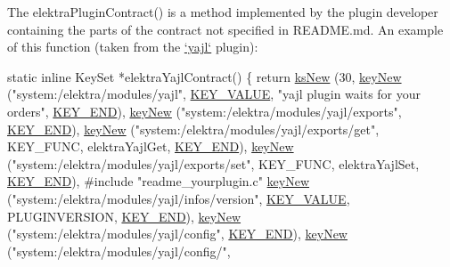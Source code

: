 The {\ttfamily elektra\+Plugin\+Contract()} is a method implemented by the plugin developer containing the parts of the contract not specified in {\ttfamily R\+E\+A\+D\+M\+E.\+md}. An example of this function (taken from the \hyperlink{autotoc_md786_src_plugins_yajl_README_md}{`yajl`} plugin)\+:


\begin{DoxyCode}
\textcolor{keyword}{static} \textcolor{keyword}{inline} KeySet *elektraYajlContract()
\{
        \textcolor{keywordflow}{return} \hyperlink{group__keyset_ga671e1aaee3ae9dc13b4834a4ddbd2c3c}{ksNew} (30,
        \hyperlink{group__key_gad23c65b44bf48d773759e1f9a4d43b89}{keyNew} (\textcolor{stringliteral}{"system:/elektra/modules/yajl"},
                \hyperlink{group__key_gga9b703ca49f48b482def322b77d3e6bc8ac66e4a49d09212b79f5754ca6db5bd2e}{KEY\_VALUE}, \textcolor{stringliteral}{"yajl plugin waits for your orders"}, \hyperlink{group__key_gga9b703ca49f48b482def322b77d3e6bc8aa8adb6fcb92dec58fb19410eacfdd403}{KEY\_END}),
        \hyperlink{group__key_gad23c65b44bf48d773759e1f9a4d43b89}{keyNew} (\textcolor{stringliteral}{"system:/elektra/modules/yajl/exports"}, \hyperlink{group__key_gga9b703ca49f48b482def322b77d3e6bc8aa8adb6fcb92dec58fb19410eacfdd403}{KEY\_END}),
        \hyperlink{group__key_gad23c65b44bf48d773759e1f9a4d43b89}{keyNew} (\textcolor{stringliteral}{"system:/elektra/modules/yajl/exports/get"},
                KEY\_FUNC, elektraYajlGet,
                \hyperlink{group__key_gga9b703ca49f48b482def322b77d3e6bc8aa8adb6fcb92dec58fb19410eacfdd403}{KEY\_END}),
        \hyperlink{group__key_gad23c65b44bf48d773759e1f9a4d43b89}{keyNew} (\textcolor{stringliteral}{"system:/elektra/modules/yajl/exports/set"},
                KEY\_FUNC, elektraYajlSet,
                \hyperlink{group__key_gga9b703ca49f48b482def322b77d3e6bc8aa8adb6fcb92dec58fb19410eacfdd403}{KEY\_END}),
#include \textcolor{stringliteral}{"readme\_yourplugin.c"}
        \hyperlink{group__key_gad23c65b44bf48d773759e1f9a4d43b89}{keyNew} (\textcolor{stringliteral}{"system:/elektra/modules/yajl/infos/version"},
                \hyperlink{group__key_gga9b703ca49f48b482def322b77d3e6bc8ac66e4a49d09212b79f5754ca6db5bd2e}{KEY\_VALUE}, PLUGINVERSION, \hyperlink{group__key_gga9b703ca49f48b482def322b77d3e6bc8aa8adb6fcb92dec58fb19410eacfdd403}{KEY\_END}),
        \hyperlink{group__key_gad23c65b44bf48d773759e1f9a4d43b89}{keyNew} (\textcolor{stringliteral}{"system:/elektra/modules/yajl/config"}, \hyperlink{group__key_gga9b703ca49f48b482def322b77d3e6bc8aa8adb6fcb92dec58fb19410eacfdd403}{KEY\_END}),
        \hyperlink{group__key_gad23c65b44bf48d773759e1f9a4d43b89}{keyNew} (\textcolor{stringliteral}{"system:/elektra/modules/yajl/config/"},

\end{DoxyCode}
